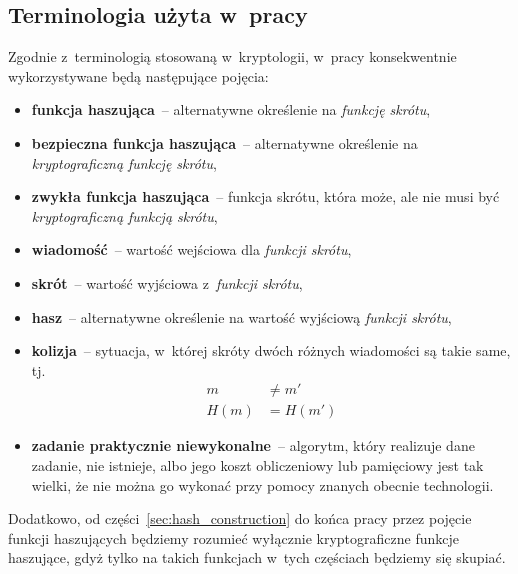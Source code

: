 \documentclass[12pt,a4paper,twoside]{article}
\begin{document}
\subsection{Terminologia użyta w~pracy}
Zgodnie z~terminologią stosowaną w~kryptologii, w~pracy konsekwentnie
wykorzystywane będą następujące pojęcia:

\begin{itemize}

    \item \textbf{funkcja haszująca}~-- alternatywne określenie na
    \emph{funkcję skrótu},

    \item \textbf{bezpieczna funkcja haszująca}~-- alternatywne określenie na
    \emph{kryptograficzną funkcję skrótu},

    \item \textbf{zwykła funkcja haszująca}~-- funkcja skrótu, która może, ale
    nie musi być \emph{kryptograficzną funkcją skrótu},

    \item \textbf{wiadomość}~-- wartość wejściowa dla \emph{funkcji skrótu},

    \item \textbf{skrót}~-- wartość wyjściowa z~\emph{funkcji skrótu},

    \item \textbf{hasz}~-- alternatywne określenie na wartość wyjściową
    \emph{funkcji skrótu},

    \item \textbf{kolizja}~-- sytuacja, w~której skróty dwóch różnych
    wiadomości są takie same, tj.
    \[
        \begin{aligned}
        m &\neq m' \\
        H(m) &= H(m')
        \end{aligned}
    \]

    \item \textbf{zadanie praktycznie niewykonalne}~-- algorytm, który
    realizuje dane zadanie, nie istnieje, albo jego koszt obliczeniowy lub
    pamięciowy jest tak wielki, że nie można go wykonać przy pomocy znanych
    obecnie technologii.

\end{itemize}

Dodatkowo, od części~\ref{sec:hash_construction} do końca pracy przez pojęcie
funkcji haszujących będziemy rozumieć wyłącznie kryptograficzne funkcje
haszujące, gdyż tylko na takich funkcjach w~tych częściach będziemy się
skupiać.
\pagebreak
\end{document}
